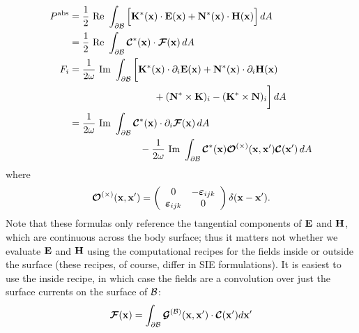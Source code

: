 \begin{subequations}
\begin{align}
 P^{\hbox{\scriptsize{abs}}} 
     &= \frac{1}{2}\text{ Re }
      \int_{\partial \mathcal{B}} \Big[ \mathbf{K}^*(\mathbf{x}) \cdot \mathbf{E}(\mathbf{x})
                                 +\mathbf{N}^*(\mathbf{x}) \cdot \mathbf{H}(\mathbf{x})
                            \Big]
      \,dA
\nonumber \\
    &= \frac{1}{2}\text{ Re }
      \int_{\partial \mathcal{B}} \boldsymbol{\mathcal{C}}^*(\mathbf{x}) \cdot \boldsymbol{\mathcal{F}}(\mathbf{x}) \,dA
\\
 F_i
     &= \frac{1}{2\omega}\text{ Im }
      \int_{\partial \mathcal{B}} 
       \bigg[  \mathbf{K}^*(\mathbf{x}) \cdot \partial_i \mathbf{E}(\mathbf{x})
              +\mathbf{N}^*(\mathbf{x}) \cdot \partial_i \mathbf{H}(\mathbf{x})
\nonumber \\
&
 \hspace{1.2in} +(\mathbf{N}^*\times \mathbf{K})_i - (\mathbf{K}^*\times \mathbf{N})_i
       \bigg]
      \,dA
\\
    &= \frac{1}{2\omega }\text{ Im }
        \int_{\partial \mathcal{B}} \boldsymbol{\mathcal{C}}^*(\mathbf{x}) \cdot \partial_i \boldsymbol{\mathcal{F}}(\mathbf{x}) \,dA
\nonumber \\
&\hspace{1.0in}
      -\frac{1}{2\omega }\text{ Im }
        \int_{\partial \mathcal{B}} 
        \boldsymbol{\mathcal{C}}^*(\mathbf{x}) 
        \boldsymbol{\mathcal{O}}^{(\times)}(\mathbf{x},\mathbf{x}^\prime) 
        \boldsymbol{\mathcal{C}}(\mathbf{x}^\prime)
        \,dA
\end{align}
\label{EPPFT0}
\end{subequations}
where 
$$ \boldsymbol{\mathcal{O}}^{(\times)}(\mathbf{x},\mathbf{x}^\prime)
  = \left(\begin{array}{cc}
    0 & -\boldsymbol{\varepsilon}_{ijk} \\ 
     \boldsymbol{\varepsilon}_{ijk} & 0
   \end{array}\right)
   \delta(\mathbf{x}-\mathbf{x}^\prime).
$$
Note that these formulas only reference the tangential components
of $\mathbf{E}$ and $\mathbf{H}$, which are continuous across the body 
surface; thus it matters not whether we evaluate $\mathbf{E}$ and $\mathbf{H}$
using the computational recipes for the fields inside or outside
the surface (these recipes, of course, differ in SIE formulations).
It is easiest to use the inside recipe, in which case the fields
are a convolution over just the surface currents on the surface 
of $\mathcal{B}$:
$$ \boldsymbol{\mathcal{F}}(\mathbf{x}) 
   = \int_{\partial \mathcal{B}} \boldsymbol{\mathcal{G}}^{(\mathcal{B})}(\mathbf{x}, \mathbf{x}^\prime) \cdot \boldsymbol{\mathcal{C}}(\mathbf{x}^\prime) 
   d\mathbf{x}^\prime
$$ 
